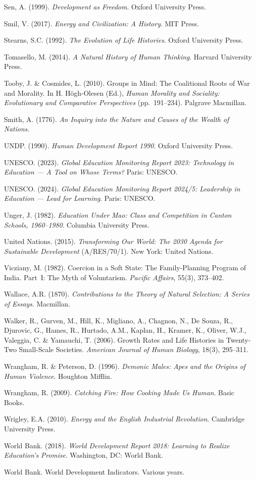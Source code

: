 \documentclass[12pt,letterpaper]{article}
\begin{document}
Sen, A. (1999). \emph{Development as Freedom}. Oxford University Press.

Smil, V. (2017). \emph{Energy and Civilization: A History}. MIT Press.

Stearns, S.C. (1992). \emph{The Evolution of Life Histories}. Oxford
University Press.

Tomasello, M. (2014). \emph{A Natural History of Human Thinking}.
Harvard University Press.

Tooby, J. \& Cosmides, L. (2010). Groups in Mind: The Coalitional Roots
of War and Morality. In H. H\"{o}gh-Olesen (Ed.), \emph{Human Morality
and Sociality: Evolutionary and Comparative Perspectives} (pp.~191--234).
Palgrave Macmillan.

Smith, A. (1776). \emph{An Inquiry into the Nature and Causes of the
Wealth of Nations}.

UNDP. (1990). \emph{Human Development Report 1990}. Oxford University
Press.

UNESCO. (2023). \emph{Global Education Monitoring Report 2023:
Technology in Education --- A Tool on Whose Terms?} Paris: UNESCO.

UNESCO. (2024). \emph{Global Education Monitoring Report 2024/5:
Leadership in Education --- Lead for Learning}. Paris: UNESCO.

Unger, J. (1982). \emph{Education Under Mao: Class and Competition in
Canton Schools, 1960--1980}. Columbia University Press.

United Nations. (2015). \emph{Transforming Our World: The 2030 Agenda
for Sustainable Development} (A/RES/70/1). New York: United Nations.

Vicziany, M. (1982). Coercion in a Soft State: The Family-Planning
Program of India. Part~I: The Myth of Voluntarism. \emph{Pacific
Affairs}, 55(3), 373--402.

Wallace, A.R. (1870). \emph{Contributions to the Theory of Natural
Selection: A Series of Essays}. Macmillan.

Walker, R., Gurven, M., Hill, K., Migliano, A., Chagnon, N., De
Souza, R., Djurovic, G., Hames, R., Hurtado, A.M., Kaplan, H.,
Kramer, K., Oliver, W.J., Valeggia, C. \& Yamauchi, T. (2006). Growth
Rates and Life Histories in Twenty-Two Small-Scale Societies.
\emph{American Journal of Human Biology}, 18(3), 295--311.

Wrangham, R. \& Peterson, D. (1996). \emph{Demonic Males: Apes and
the Origins of Human Violence}. Houghton Mifflin.

Wrangham, R. (2009). \emph{Catching Fire: How Cooking Made Us Human}.
Basic Books.

Wrigley, E.A. (2010). \emph{Energy and the English Industrial
Revolution}. Cambridge University Press.

World Bank. (2018). \emph{World Development Report 2018: Learning to
Realize Education's Promise}. Washington, DC: World Bank.

World Bank. World Development Indicators. Various years.
\end{document}
